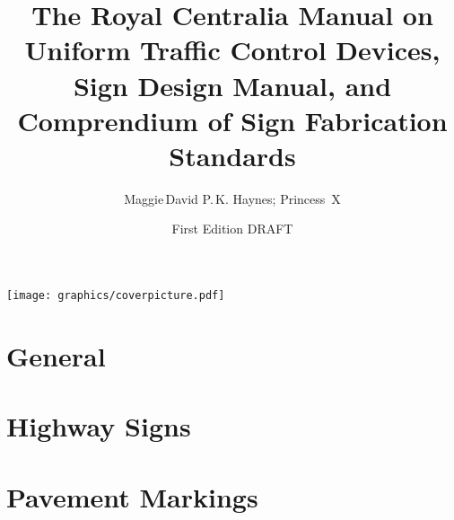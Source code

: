 \documentclass[9pt]{memoir}
\begin{document}
\title{The Royal Centralia Manual on Uniform Traffic Control Devices, Sign Design Manual, and Comprendium of Sign Fabrication Standards}
\author{Maggie\,David P.\,K. Haynes; Princess~X}
\date{First Edition DRAFT}


\maketitle

{\centering\texttt{[image: graphics/coverpicture.pdf]}\par}

\cleartorecto

\tableofcontents*






\part{General}



\part{Highway Signs}





























\part{Pavement Markings}
\end{document}
